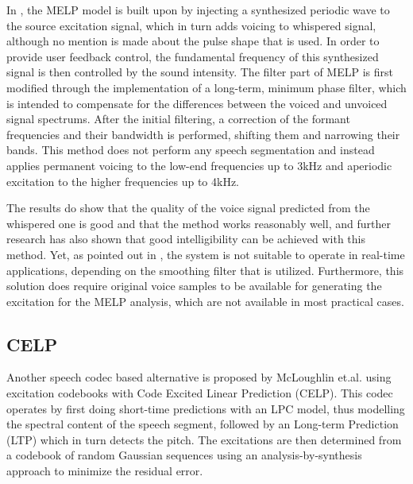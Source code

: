 In \cite{morrisReconstructionSpeechWhispers2002a}, the MELP model is built upon by injecting a synthesized periodic wave to the source excitation signal, which in turn adds voicing to whispered signal, although no mention is made about the pulse shape that is used. In order to provide user feedback control, the fundamental frequency of this synthesized signal is then controlled by the sound intensity. The filter part of MELP is first modified through the implementation of a long-term, minimum phase filter, which is intended to compensate for the differences between the voiced and unvoiced signal spectrums. After the initial filtering, a correction of the formant frequencies and their bandwidth is performed, shifting them and narrowing their bands. This method does not perform any speech segmentation and instead applies permanent voicing to the low-end frequencies up to 3kHz and aperiodic excitation to the higher frequencies up to 4kHz. 

The results do show that the quality of the voice signal predicted from the whispered one is good and that the method works reasonably well, and further research \cite{huangReconstructionWhisperChinese2012} has also shown that good intelligibility can be achieved with this method. Yet, as pointed out in \cite{mcloughlinReconstructionContinuousVoiced2013,ferreiraImplantationVoicingWhispered2016}, the system is not suitable to operate in real-time applications, depending on the smoothing filter that is utilized. Furthermore, this solution does require original voice samples to be available for generating the excitation for the MELP analysis, which are not available in most practical cases.

\subsection{CELP}

Another speech codec based alternative is proposed by McLoughlin et.al. \cite{mcloughlinReconstructionPhonatedSpeech2015} using excitation codebooks with Code Excited Linear Prediction (CELP). This codec operates by first doing short-time predictions with an LPC model, thus modelling the spectral content of the speech segment, followed by an Long-term Prediction (LTP) which in turn detects the pitch. The excitations are then determined from a codebook of random Gaussian sequences using an analysis-by-synthesis approach to minimize the residual error.

